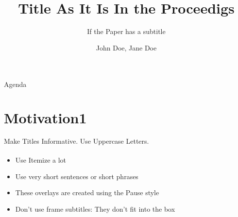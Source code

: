 \documentclass[english,american,german,aspectratio=43]{beamer}
\title{Title As It Is In the Proceedigs}
\subtitle{If the Paper has a subtitle}
\author{John Doe, Jane Doe}
\begin{document}
\begin{frame}{Agenda}
  \tableofcontents
\end{frame}
\breadcrumbson
\section{Motivation1}
\begin{frame}{Make Titles Informative. Use Uppercase Letters.}

  \framesubtitle{}
  \begin{itemize}
    \item Use Itemize a lot

      \pause{}
    \item Use very short sentences or short phrases

      \pause{}
    \item These overlays are created using the Pause style

      \pause{}
    \item Don't use frame subtitles: They don't fit into the box
  \end{itemize}
\end{frame}
\end{document}
